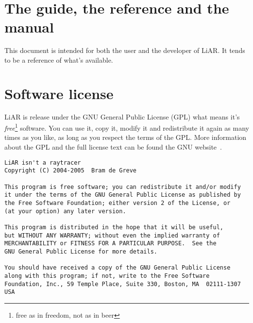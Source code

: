 \section{The guide, the reference and the manual}

This document is intended for both the user and the developer of LiAR.  It tends to be a reference of what's available.


\section{Software license}

LiAR is release under the GNU General Public License (GPL) what means it's \emph{free}\footnote{free as in freedom, not as in beer} software.  You can use it, copy it, modify it and redistribute it again as many times as you like, as long as you respect the terms of the GPL.  More information about the GPL and the full license text can be found the GNU website~\cite{GPL}.

\begin{footnotesize}
\begin{verbatim}
LiAR isn't a raytracer
Copyright (C) 2004-2005  Bram de Greve

This program is free software; you can redistribute it and/or modify
it under the terms of the GNU General Public License as published by
the Free Software Foundation; either version 2 of the License, or
(at your option) any later version.

This program is distributed in the hope that it will be useful,
but WITHOUT ANY WARRANTY; without even the implied warranty of
MERCHANTABILITY or FITNESS FOR A PARTICULAR PURPOSE.  See the
GNU General Public License for more details.

You should have received a copy of the GNU General Public License
along with this program; if not, write to the Free Software
Foundation, Inc., 59 Temple Place, Suite 330, Boston, MA  02111-1307  USA
\end{verbatim}
\end{footnotesize}
